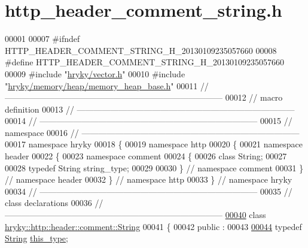 \hypertarget{http__header__comment__string_8h_source}{\section{http\-\_\-header\-\_\-comment\-\_\-string.\-h}
}

\begin{DoxyCode}
00001 
00007 \textcolor{preprocessor}{#ifndef HTTP\_HEADER\_COMMENT\_STRING\_H\_20130109235057660}
00008 \textcolor{preprocessor}{}\textcolor{preprocessor}{#define HTTP\_HEADER\_COMMENT\_STRING\_H\_20130109235057660}
00009 \textcolor{preprocessor}{}\textcolor{preprocessor}{#include "\hyperlink{vector_8h}{hryky/vector.h}"}
00010 \textcolor{preprocessor}{#include "\hyperlink{memory__heap__base_8h}{hryky/memory/heap/memory_heap_base.h}"}
00011 \textcolor{comment}{//
      ------------------------------------------------------------------------------}
00012 \textcolor{comment}{// macro definition}
00013 \textcolor{comment}{//
      ------------------------------------------------------------------------------}
00014 \textcolor{comment}{//
      ------------------------------------------------------------------------------}
00015 \textcolor{comment}{// namespace}
00016 \textcolor{comment}{//
      ------------------------------------------------------------------------------}
00017 \textcolor{keyword}{namespace }hryky
00018 \{
00019 \textcolor{keyword}{namespace }http
00020 \{
00021 \textcolor{keyword}{namespace }header
00022 \{
00023 \textcolor{keyword}{namespace }comment
00024 \{
00026     \textcolor{keyword}{class }String;
00027 
00028     \textcolor{keyword}{typedef} String string\_type;
00029 
00030 \} \textcolor{comment}{// namespace comment}
00031 \} \textcolor{comment}{// namespace header}
00032 \} \textcolor{comment}{// namespace http}
00033 \} \textcolor{comment}{// namespace hryky}
00034 \textcolor{comment}{//
      ------------------------------------------------------------------------------}
00035 \textcolor{comment}{// class declarations}
00036 \textcolor{comment}{//
      ------------------------------------------------------------------------------}
\hypertarget{http__header__comment__string_8h_source_l00040}{}\hyperlink{classhryky_1_1http_1_1header_1_1comment_1_1_string}{00040} \textcolor{comment}{}\textcolor{keyword}{class }\hyperlink{classhryky_1_1http_1_1header_1_1comment_1_1_string}{hryky::http::header::comment::String}
00041 \{
00042 \textcolor{keyword}{public} :
00043 
\hypertarget{http__header__comment__string_8h_source_l00044}{}\hyperlink{classhryky_1_1http_1_1header_1_1comment_1_1_string_ad669eebb23e95ec308a0964fb7863a24}{00044}     \textcolor{keyword}{typedef} \hyperlink{classhryky_1_1http_1_1header_1_1comment_1_1_string}{String} \hyperlink{classhryky_1_1http_1_1header_1_1comment_1_1_string_ad669eebb23e95ec308a0964fb7863a24}{this_type};

\end{DoxyCode}
